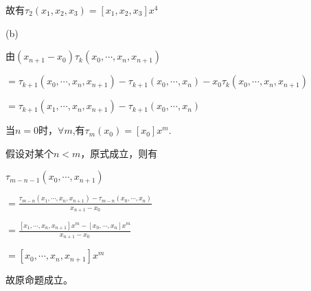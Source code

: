 \documentclass[12]{article}%
\begin{document}
            故有$\tau_{2}(x_1,x_2,x_3)=[x_1,x_2,x_3]x^4$

            (b)

            由$(x_{n+1}-x_0)\tau_k(x_0,\cdots,x_n,x_{n+1})$

            $=\tau_{k+1}(x_0,\cdots,x_n,x_{n+1})-\tau_{k+1}(x_0,\cdots,x_n)-x_0\tau_k(x_0,\cdots,x_n,x_{n+1})$

            $=\tau_{k+1}(x_1,\cdots,x_n,x_{n+1})-\tau_{k+1}(x_0,\cdots,x_n)$

            当$n=0$时，$\forall m$,有$\tau_m(x_0)=[x_0]x^m$.

            假设对某个$n<m$，原式成立，则有

            $\tau_{m-n-1}(x_0,\cdots,x_{n+1})$

            $=\frac{\tau_{m-n}(x_1,\cdots,x_n,x_{n+1})-\tau_{m-n}(x_0,\cdots,x_n)}{x_{n+1}-x_0}$
            
            $=\frac{[x_1,\cdots,x_n,x_{n+1}]x^m-[x_0,\cdots,x_n]x^m}{x_{n+1}-x_0}$

            $=[x_0,\cdots,x_n,x_{n+1}]x^m$

            故原命题成立。
            
\end{document}
